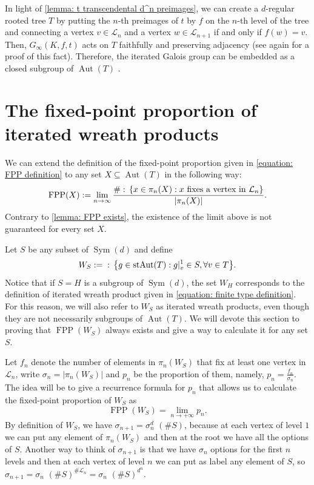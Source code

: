 \documentclass{amsart}
\def\set#1{{\def\st{\;:\;}\left\{#1\right\}}}
\def\abs#1{\left\vert{#1}\right\vert}
\DeclareMathOperator{\Aut}{Aut}
\DeclareMathOperator{\FPP}{FPP}
\DeclareMathOperator{\Sym}{Sym}
\DeclareMathOperator{\st}{st}
\begin{document}
In light of \cref{lemma: t transcendental d^n preimages}, we can create a $d$-regular rooted tree $T$ by putting the $n$-th preimages of $t$ by $f$ on the $n$-th level of the tree and connecting a vertex $v \in \mathcal{L}_n$ and a vertex $w \in \mathcal{L}_{n+1}$ if and only if $f(w) = v$. Then, $G_\infty(K,f,t)$ acts on $T$ faithfully and preserving adjacency (see again \cite{Jones2014} for a proof of this fact). Therefore, the iterated Galois group can be embedded as a closed subgroup of $\Aut(T)$ .

\section{The fixed-point proportion of iterated wreath products}
\label{section: FPP of IWP}

We can extend the definition of the fixed-point proportion given in \cref{equation: FPP definition} to any set $X \subseteq \Aut(T)$ in the following way:
\begin{equation}
\FPP(X) := \lim_{n \rightarrow \infty} \frac{\# \set{x\in \pi_n(X): \text{$x$ fixes a vertex in $\mathcal{L}_n$}}}{\abs{\pi_n(X)}}.
\label{equation: definition FPP for sets}
\end{equation}
Contrary to \cref{lemma: FPP exists}, the existence of the limit above is not guaranteed for every set $X$.

Let $S$ be any subset of $\Sym(d)$ and define $$W_S := \set{g \in \Aut(T): g|_v^1 \in S, \forall v \in T}.$$ Notice that if $S = H$ is a subgroup of $\Sym(d)$, the set $W_H$ corresponds to the definition of iterated wreath product given in \cref{equation: finite type definition}. For this reason, we will also refer to $W_S$ as iterated wreath products, even though they are not necessarily subgroups of $\Aut(T)$. We will devote this section to proving that $\FPP(W_S)$ always exists and give a way to calculate it for any set $S$. 

Let $f_n$ denote the number of elements in $\pi_n(W_S)$ that fix at least one vertex in $\mathcal{L}_n$, write $\sigma_n = \abs{\pi_n(W_S)}$ and $p_n$ be the proportion of them, namely, $p_n = \frac{f_n}{\sigma_n}$. The idea will be to give a recurrence formula for $p_n$ that allows us to calculate the fixed-point proportion of $W_S$ as $$\FPP(W_S) = \lim_{n \rightarrow + \infty} p_n.$$  By definition of $W_S$, we have $\sigma_{n+1} = \sigma_n^d \,\, (\# S)$, because at each vertex of level $1$ we can put any element of $\pi_n(W_S)$ and then at the root we have all the options of $S$. Another way to think of $\sigma_{n+1}$ is that we have $\sigma_n$ options for the first $n$ levels and then at each vertex of level $n$ we can put as label any element of $S$, so $\sigma_{n+1} = \sigma_n \,\, (\#S)^{\# \mathcal{L}_n} = \sigma_n \,\, (\# S)^{d^n}$.
\end{document}
